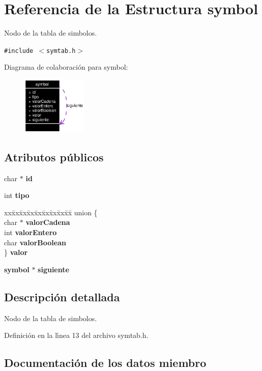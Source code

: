 \section{Referencia de la Estructura symbol}
\label{structsymbol}
Nodo de la tabla de simbolos.  


{\tt \#include $<$symtab.h$>$}

Diagrama de colaboraci\'{o}n para symbol:\begin{figure}[H]
\begin{center}
\leavevmode
\includegraphics[width=88pt]{structsymbol__coll__graph}
\end{center}
\end{figure}
\subsection*{Atributos p\'{u}blicos}
\begin{CompactItemize}
\item 
char $\ast$ {\bf id}
\item 
int {\bf tipo}
\item 
\begin{tabbing}
xx\=xx\=xx\=xx\=xx\=xx\=xx\=xx\=xx\=\kill
union \{\\
\>char $\ast$ {\bf valorCadena}\\
\>int {\bf valorEntero}\\
\>char {\bf valorBoolean}\\
\} {\bf valor}\\

\end{tabbing}\item 
{\bf symbol} $\ast$ {\bf siguiente}
\end{CompactItemize}


\subsection{Descripci\'{o}n detallada}
Nodo de la tabla de simbolos. 



Definici\'{o}n en la l\'{\i}nea 13 del archivo symtab.h.

\subsection{Documentaci\'{o}n de los datos miembro}
